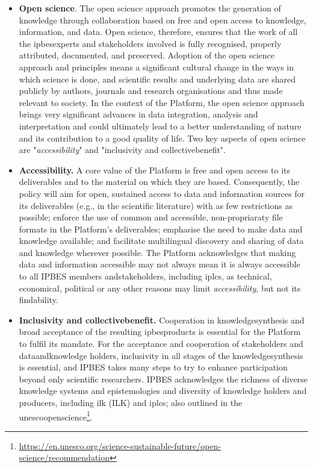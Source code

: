 \documentclass{article}
\begin{document}
\begin{itemize}
    \item \textbf{Open science}. The open science approach promotes the generation of \gls{knowledge} through collaboration based on free and open access to \gls{knowledge}, information, and \gls{data}. Open science, therefore, ensures that the work of all the \glspl{ipbesexpert} and \glspl{stakeholder} involved is fully recognised, properly attributed, documented, and preserved. Adoption of the open science approach and principles means a significant cultural change in the ways in which science is done, and scientific results and underlying \gls{data} are shared publicly by authors, journals and research organisations and thus made relevant to society. In the context of the Platform, the open science approach brings very significant advances in \gls{data} integration, analysis and interpretation and could ultimately lead to a better understanding of nature and its contribution to a good quality of life. Two key aspects of open science are "\textit{accessibility}" and "inclusivity and \gls{collectivebenefit}".

    \item \textbf{Accessibility.} A core value of the Platform is free and open access to its deliverables and to the material on which they are based. Consequently, the policy will aim for open, sustained access to \gls{data} and information sources for its deliverables (e.g., in the scientific literature) with as few restrictions as possible; enforce the use of common and \gls{accessible}, non-propriaraty file formats in the Platform's deliverables; emphasise the need to make data and knowledge available;  and facilitate multilingual discovery and sharing of \gls{data} and knowledge wherever possible. The Platform acknowledges that making \gls{data} and information \gls{accessible} may not always mean it is always \gls{accessible} to all IPBES members and\glspl{stakeholder}, including \glspl{iplc}, as technical, economical, political or any other reasons may limit \textit{accessibility}, but not its findability.
    
    \item \textbf{Inclusivity and \gls{collectivebenefit}.} Cooperation in \gls{knowledgesynthesis} and broad acceptance of the resulting \glspl{ipbesproduct} is essential for the Platform to fulfil its mandate. For the acceptance and cooperation of \glspl{stakeholder} and \gls{dataandknowledge} holders, inclusivity in all stages of the \gls{knowledgesynthesis} is essential, and IPBES takes many steps to try to enhance participation beyond only scientific researchers. IPBES acknowledges the richness of diverse knowledge systems and epistemologies and diversity of knowledge holders and producers, including \gls{ilk} (ILK) and \glspl{iplc}; also outlined in the \gls{unescoopenscience}\footnote{\href{https://en.unesco.org/science-sustainable-future/open-science/recommendation}{https://en.unesco.org/science-sustainable-future/open-science/recommendation}}.


\end{itemize}
\end{document}
